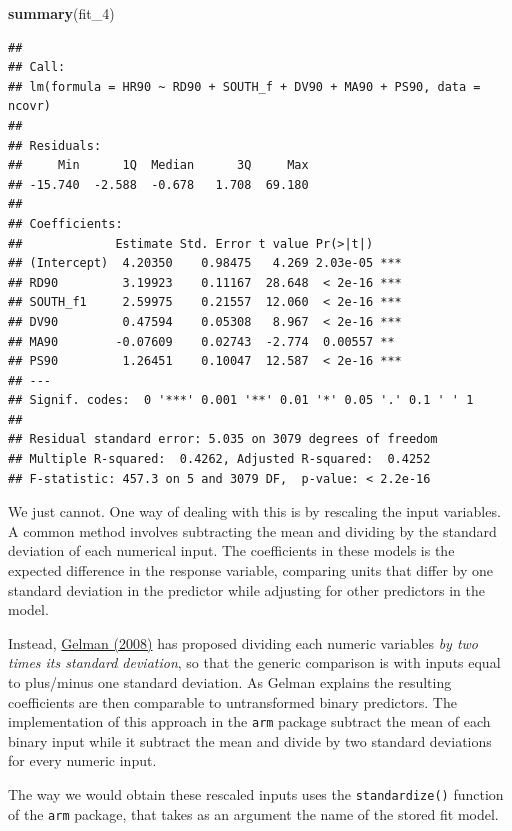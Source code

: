 \documentclass[]{book}
\newenvironment{Shaded}{\begin{snugshade}}{\end{snugshade}}
\newcommand{\DecValTok}[1]{\textcolor[rgb]{0.00,0.00,0.81}{#1}}
\newcommand{\KeywordTok}[1]{\textcolor[rgb]{0.13,0.29,0.53}{\textbf{#1}}}
\newcommand{\NormalTok}[1]{#1}
\begin{document}
\begin{Shaded}
\begin{Highlighting}[]
\KeywordTok{summary}\NormalTok{(fit_}\DecValTok{4}\NormalTok{)}
\end{Highlighting}
\end{Shaded}

\begin{verbatim}
## 
## Call:
## lm(formula = HR90 ~ RD90 + SOUTH_f + DV90 + MA90 + PS90, data = ncovr)
## 
## Residuals:
##     Min      1Q  Median      3Q     Max 
## -15.740  -2.588  -0.678   1.708  69.180 
## 
## Coefficients:
##             Estimate Std. Error t value Pr(>|t|)    
## (Intercept)  4.20350    0.98475   4.269 2.03e-05 ***
## RD90         3.19923    0.11167  28.648  < 2e-16 ***
## SOUTH_f1     2.59975    0.21557  12.060  < 2e-16 ***
## DV90         0.47594    0.05308   8.967  < 2e-16 ***
## MA90        -0.07609    0.02743  -2.774  0.00557 ** 
## PS90         1.26451    0.10047  12.587  < 2e-16 ***
## ---
## Signif. codes:  0 '***' 0.001 '**' 0.01 '*' 0.05 '.' 0.1 ' ' 1
## 
## Residual standard error: 5.035 on 3079 degrees of freedom
## Multiple R-squared:  0.4262, Adjusted R-squared:  0.4252 
## F-statistic: 457.3 on 5 and 3079 DF,  p-value: < 2.2e-16
\end{verbatim}

We just cannot. One way of dealing with this is by rescaling the input variables. A common method involves subtracting the mean and dividing by the standard deviation of each numerical input. The coefficients in these models is the expected difference in the response variable, comparing units that differ by one standard deviation in the predictor while adjusting for other predictors in the model.

Instead, \href{http://www.stat.columbia.edu/~gelman/research/published/standardizing7.pdf}{Gelman (2008)} has proposed dividing each numeric variables \emph{by two times its standard deviation}, so that the generic comparison is with inputs equal to plus/minus one standard deviation. As Gelman explains the resulting coefficients are then comparable to untransformed binary predictors. The implementation of this approach in the \texttt{arm} package subtract the mean of each binary input while it subtract the mean and divide by two standard deviations for every numeric input.

The way we would obtain these rescaled inputs uses the \texttt{standardize()} function of the \texttt{arm} package, that takes as an argument the name of the stored fit model.
\end{document}
